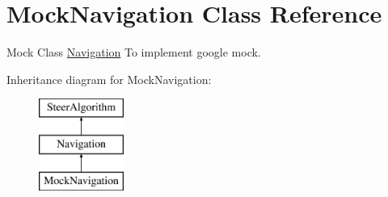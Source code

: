 \hypertarget{class_mock_navigation}{}\section{Mock\+Navigation Class Reference}
\label{class_mock_navigation}


Mock Class \hyperlink{class_navigation}{Navigation} To implement google mock.  


Inheritance diagram for Mock\+Navigation\+:\begin{figure}[H]
\begin{center}
\leavevmode
\includegraphics[height=3.000000cm]{class_mock_navigation}
\end{center}
\end{figure}

